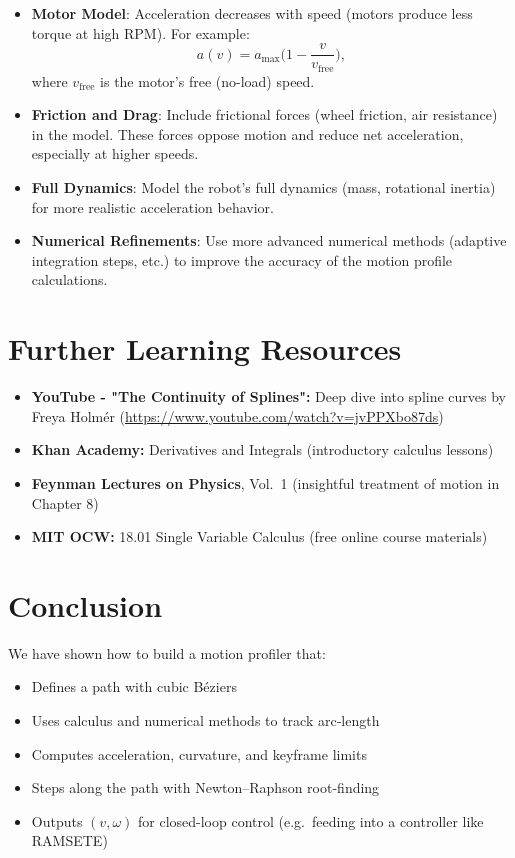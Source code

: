 \documentclass[11pt]{article}
\begin{document}
\begin{itemize}
  \item \textbf{Motor Model}: Acceleration decreases with speed (motors produce less torque at high RPM). For example:
  \[
    a(v) = a_{\text{max}}\Big(1 - \frac{v}{v_{\text{free}}}\Big),
  \]
  where $v_{\text{free}}$ is the motor’s free (no-load) speed.
  \item \textbf{Friction and Drag}: Include frictional forces (wheel friction, air resistance) in the model. These forces oppose motion and reduce net acceleration, especially at higher speeds.
  \item \textbf{Full Dynamics}: Model the robot’s full dynamics (mass, rotational inertia) for more realistic acceleration behavior.
  \item \textbf{Numerical Refinements}: Use more advanced numerical methods (adaptive integration steps, etc.) to improve the accuracy of the motion profile calculations.
\end{itemize}

\section{Further Learning Resources}

\begin{itemize}
  \item \textbf{YouTube - "The Continuity of Splines":} Deep dive into spline curves by Freya Holmér (\url{https://www.youtube.com/watch?v=jvPPXbo87ds})
  \item \textbf{Khan Academy:} Derivatives and Integrals (introductory calculus lessons)
  \item \textbf{Feynman Lectures on Physics}, Vol.~1 (insightful treatment of motion in Chapter 8)
  \item \textbf{MIT OCW:} 18.01 Single Variable Calculus (free online course materials)
\end{itemize}

\section{Conclusion}

We have shown how to build a motion profiler that:
\begin{itemize}
  \item Defines a path with cubic Béziers
  \item Uses calculus and numerical methods to track arc‐length
  \item Computes acceleration, curvature, and keyframe limits
  \item Steps along the path with Newton–Raphson root-finding
  \item Outputs \((v,\omega)\) for closed-loop control (e.g.\ feeding into a controller like RAMSETE)
\end{itemize}
\end{document}
